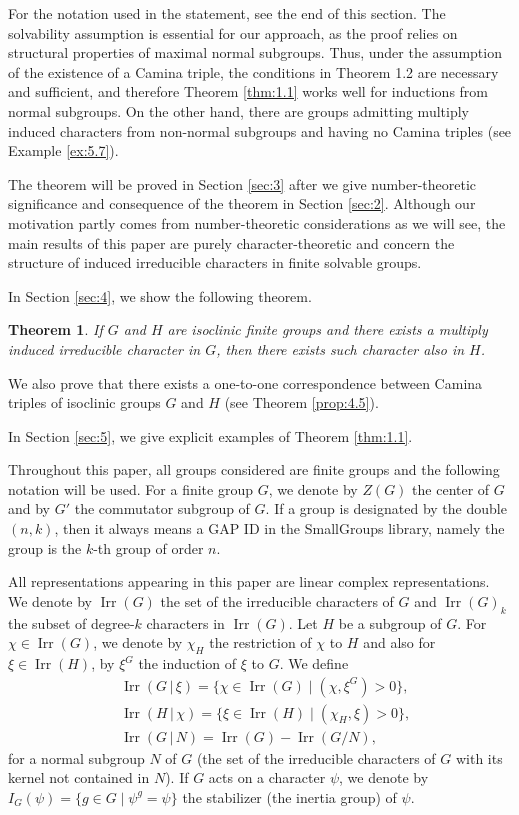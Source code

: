 \documentclass[a4paper,12pt]{article}
\newtheorem{theorem}{Theorem}[section]
\theoremstyle{definition}
\theoremstyle{remark}
\DeclareMathOperator{\irr}{Irr}
\numberwithin{equation}{section}
\begin{document}
For the notation used in the statement, see the end of this section.
The solvability assumption is essential for our approach, 
as the proof relies on structural properties of maximal normal subgroups.
Thus, under the assumption of the existence of a Camina triple, 
the conditions in Theorem 1.2 are necessary and sufficient, and therefore
Theorem \ref{thm:1.1} works well for inductions from normal subgroups.
On the other hand, there are groups admitting multiply induced characters
from non-normal subgroups and having no Camina triples (see Example \ref{ex:5.7}). 


The theorem will be proved in Section \ref{sec:3} after
we give number-theoretic significance and consequence of the theorem in Section \ref{sec:2}.
Although our motivation partly comes from number-theoretic considerations as we will see, 
the main results of this paper are purely character-theoretic and concern 
the structure of induced irreducible characters in finite solvable groups.

In Section \ref{sec:4}, we show the following theorem.

\begin{theorem} \label{thm:1.2}
    If $G$ and $H$ are isoclinic finite groups and there exists a multiply induced irreducible character in $G$,
    then there exists such character also in $H$.
\end{theorem}

We also prove 
that there exists a one-to-one correspondence between Camina triples of isoclinic groups $G$ and $H$ 
(see Theorem \ref{prop:4.5}).

In Section \ref{sec:5}, we give explicit examples of Theorem \ref{thm:1.1}. 

Throughout this paper, all groups considered are finite groups
and the following notation will be used.
For a finite group $G$, we denote by $Z(G)$ the center of $G$ and by
$G'$ the commutator subgroup of $G$.
If a group is designated by the double $(n,k)$, then it always means a GAP ID in 
the SmallGroups library, namely the group is the $k$-th group of order $n$.

All representations appearing in this paper are linear complex representations.
We denote by $\irr (G)$ the set of the irreducible characters of $G$ and
$\irr (G)_k$ the subset of degree-$k$ characters in $\irr (G)$.
Let $H$ be a subgroup of $G$. For $\chi \in \irr  (G)$, we denote by 
$\chi_H$ the restriction of $\chi$ to $H$ and also for $\xi \in \irr (H)$,
by $\xi^G$ the induction of $\xi$ to $G$. 
We define  
\begin{align*}
& \irr (G \,|\, \xi) = \{ \chi \in \irr (G) \mid (\chi , \xi^G) >0 \}, \\
& \irr (H \,|\, \chi ) = \{ \xi \in \irr (H) \mid (\chi_H, \xi ) >0 \},   \\
& \irr (G \,|\, N ) = \irr (G) - \irr (G/N),
\end{align*}
for a normal subgroup $N$ of $G$ (the set of the irreducible characters of $G$ with its kernel not contained in $N$). 
If $G$ acts on a character $\psi$, we denote by $I_G (\psi ) = \{ g \in G \mid \psi^g = \psi \}$ the 
stabilizer (the inertia group) of $\psi $.
\end{document}
